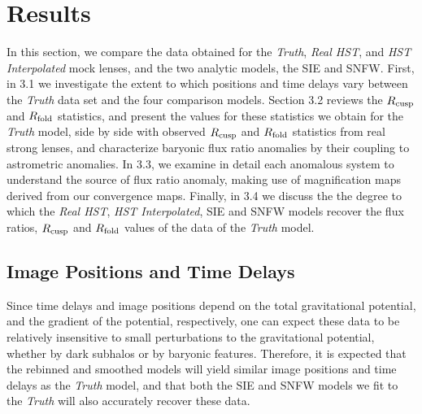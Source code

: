 \section{Results}
\label{sect:results}
In this section, we compare the data obtained for the \textit{Truth}, \textit{Real HST}, and \textit{HST Interpolated} mock lenses, and the two analytic models, the SIE and SNFW. First, in 3.1 we investigate the extent to which positions and time delays vary between the \textit{Truth} data set and the four comparison models. Section 3.2 reviews the $R_{\rm{cusp}}$ and $R_{\rm{fold}}$ statistics, and present the values for these statistics we obtain for the \textit{Truth} model, side by side with observed $R_{\rm{cusp}}$ and $R_{\rm{fold}}$ statistics from real strong lenses, and characterize baryonic flux ratio anomalies by their coupling to astrometric anomalies. In 3.3, we examine in detail each anomalous system to understand the source of flux ratio anomaly, making use of magnification maps derived from our convergence maps. Finally, in 3.4 we discuss the the degree to which the \textit{Real HST}, \textit{HST Interpolated}, SIE and SNFW models recover the flux ratios, $R_{\rm{cusp}}$ and $R_{\rm{fold}}$ values of the data of the \textit{Truth} model. 

\subsection{Image Positions and Time Delays}

Since time delays and image positions depend on the total
gravitational potential, and the gradient of the potential,
respectively, one can expect these data to be relatively insensitive
to small perturbations to the gravitational potential, whether by dark
subhalos or by baryonic features. Therefore, it is expected that the
rebinned and smoothed models will yield similar image positions and
time delays as the \textit{Truth} model, and that both the SIE
and SNFW models we fit to the \textit{Truth} will also
accurately recover these data.

